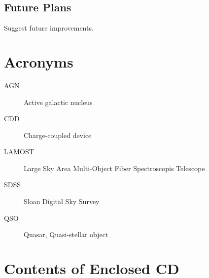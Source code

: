 \documentclass[thesis=M,english]{FITthesis}[2012/10/20]
\theoremstyle{definition}
\begin{document}
\section{Future Plans}

Suggest future improvements.




\appendix

\chapter{Acronyms}

\begin{description}
	\item[AGN] Active galactic nucleus
	\item[CDD] Charge-coupled device
	\item[LAMOST] Large Sky Area Multi-Object Fiber Spectroscopis Telescope
	\item[SDSS] Sloan Digital Sky Survey
	\item[QSO] Quasar, Quasi-stellar object
\end{description}

\chapter{Contents of Enclosed CD}

\begin{figure}
\end{figure}
\end{document}

